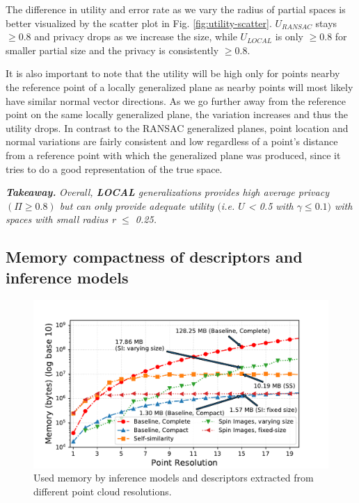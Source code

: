 The difference in utility and error rate as we vary the radius of partial spaces is better visualized by the scatter plot in Fig. \ref{fig:utility-scatter}. $U_{RANSAC}$ stays $\geq 0.8$ and privacy drops as we increase the size, while $U_{LOCAL}$ is only $\geq 0.8$ for smaller partial size and the privacy is consistently $\geq 0.8$.


It is also important to note that the utility will be high only for points nearby the reference point of a locally generalized plane as nearby points will most likely have similar normal vector directions. As we go further away from the reference point on the same locally generalized plane, the variation increases and thus the utility drops. In contrast to the RANSAC generalized planes, point location and normal variations are fairly consistent and low regardless of a point's distance from a reference point with which the generalized plane was produced, since it tries to do a good representation of the true space.

\emph{\textbf{Takeaway.}} \textit{Overall, \textbf{LOCAL} generalizations provides high average privacy $(\Pi \geq 0.8)$ but can only provide adequate utility $($i.e. $U$ < 0.5 with $\gamma \leq 0.1)$ with spaces with small radius r $\leq$ 0.25.}

\subsection{Memory compactness of descriptors and inference models}

\begin{figure}[t!]
	\centering
	\vspace{-5mm}
	\includegraphics[width=0.75\columnwidth]{figures/plots/2-memory}
	\vspace{-2mm}
	\caption{Used memory by inference models and descriptors extracted from different point cloud resolutions.}
	\label{fig:memory}
	\vspace{-3mm}
\end{figure}

